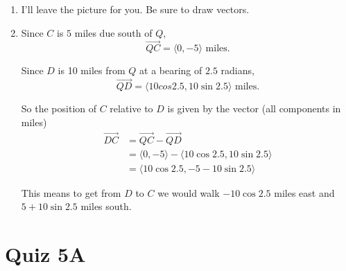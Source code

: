 \documentclass{ximera}
\begin{document}
\begin{question}
\begin{explanation}
\begin{enumerate}
\item I'll leave the picture for you. Be sure to draw vectors.

\item Since $C$ is $5$ miles due south of $Q$,
\[
 \overrightarrow{QC} = \langle 0, -5 \rangle \text{ miles}.
\] 

Since $D$ is 10 miles from $Q$ at a bearing of $2.5$ radians,
\[
   \overrightarrow{QD}  = \langle 10 cos 2.5, 10 \sin 2.5 \rangle \text{ miles}. 
\]

So the position of $C$ relative to $D$ is given by the vector (all components in miles)
\begin{align*}
   \overrightarrow{DC} &= \overrightarrow{QC} - \overrightarrow{QD} \\
                                 &= \langle 0, -5 \rangle  - \langle 10 \cos 2.5, 10 \sin 2.5 \rangle \\
                                 &= \langle 10 \cos 2.5, -5 - 10 \sin 2.5 \rangle
\end{align*}

This means to get from $D$ to $C$ we would walk $-10\cos 2.5$ miles east and $5 + 10\sin 2.5$ miles south.

\end{enumerate}
\end{explanation}
\end{question}

\section{Quiz 5A}
\end{document}
